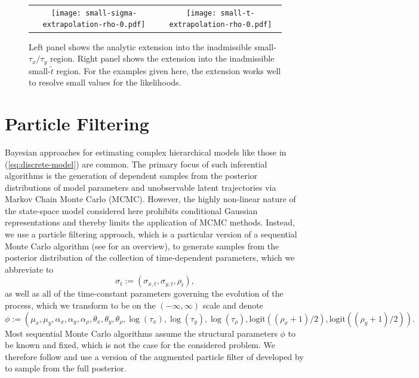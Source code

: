 \documentclass[10pt]{article}
\begin{document}
\begin{enumerate}
      \begin{figure}
  \centering
  \begin{tabular}{cc}
    \begin{minipage}{0.45\textwidth}
      \centering
      \texttt{[image: small-sigma-extrapolation-rho-0.pdf]}
    \end{minipage}
    & \begin{minipage}{0.45\textwidth}
      \centering
      \texttt{[image: small-t-extrapolation-rho-0.pdf]}
    \end{minipage}
  \end{tabular}
  \caption{Left panel shows the analytic extension into the
    inadmissible small-$\tau_x/\tau_y$ region. Right panel shows the
    extension into the inadmissible small-$\tilde{t}$ region. For the
    examples given here, the extension works well to resolve small
    values for the likelihoods.}
  \label{fig:extrapolating}
\end{figure}
    \end{enumerate}


\section{Particle Filtering} \label{particle-filtering}
Bayesian approaches for estimating complex hierarchical models like
those in (\ref{eq:discrete-model}) are common. The primary focus of such
inferential algorithms is the generation of dependent samples from the
posterior distributions of model parameters and unobservable latent
trajectories via Markov Chain Monte Carlo (MCMC). However, the highly
non-linear nature of the state-space model considered here prohibits
conditional Gaussian representations and thereby limits the
application of MCMC methods. Instead, we use a particle filtering
approach, which is a particular version of a sequential Monte Carlo
algorithm (see \cite{doucet2001sequential} for an overview), to
generate samples from the posterior distribution of the collection of
time-dependent parameters, which we abbreviate to
\[
  \sigma_t := (\sigma_{x,t}, \sigma_{y,t}, \rho_t),
\]
as well as all of the time-constant parameters governing the evolution
of the process, which we transform to be on the $(-\infty, \infty)$
scale and denote
\[
  \phi := (\mu_x, \mu_y, \alpha_x, \alpha_y, \alpha_\rho, \theta_x, \theta_y,
  \theta_\rho, \log(\tau_x), \log(\tau_y), \log(\tau_\rho),
  \mbox{logit}((\rho_x+1)/2), \mbox{logit}((\rho_y+1)/2)).
\]
Most sequential Monte Carlo algorithms assume the structural
parameters $\phi$ to be known and fixed, which is not the case for the
considered problem. We therefore follow \cite{rodriguez2012} and use a
version of the augmented particle filter of \cite{pitt1999filtering}
developed by \cite{liu2001combined} to sample from the full
posterior.
\end{document}
